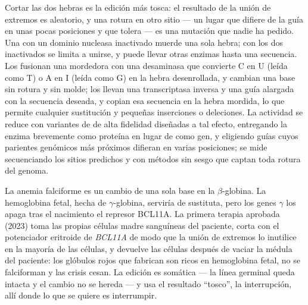 \begin{proposition}\label{prop:b3:genetic-engineering:editors}
Cortar las dos hebras es la edición más tosca: el resultado de la unión
de extremos es aleatorio, y una rotura en otro sitio --- un lugar
\emph{} que difiere de la guía en unas pocas posiciones y
que  tolera --- es una mutación que nadie ha pedido. Una  con un
dominio nucleasa inactivado muerde una sola hebra; con los dos
inactivados se limita a unirse, y puede llevar otras enzimas hasta una
secuencia. Los \emph{} fusionan una  mordedora con
una desaminasa que convierte C en U (leída como T) o A en I (leída como
G) en la hebra desenrollada, y cambian una base sin rotura y sin molde;
los \emph{} llevan una transcriptasa inversa y una guía
alargada con la secuencia deseada, y copian esa secuencia en la hebra
mordida, lo que permite cualquier sustitución y pequeñas inserciones o
deleciones. La actividad  se reduce con variantes de 
de alta fidelidad diseñadas a tal efecto, entregando la enzima brevemente
como proteína en lugar de como gen, y eligiendo guías cuyos parientes
genómicos más próximos difieran en varias posiciones; se mide
secuenciando los sitios predichos y con métodos sin sesgo que captan toda
rotura del genoma.
\end{proposition}

\begin{example}\label{ex:b3:genetic-engineering:sickle}
La anemia falciforme es un cambio de una sola base en la
$\beta$-globina. La hemoglobina fetal, hecha de $\gamma$-globina,
serviría de sustituta, pero los genes $\gamma$ los apaga tras el
nacimiento el represor BCL11A. La primera terapia  aprobada (2023)
toma las propias células madre sanguíneas del paciente, corta con  el
potenciador eritroide de \emph{BCL11A} de modo que la unión de extremos
lo inutilice en la mayoría de las células, y devuelve las células después
de vaciar la médula del paciente: los glóbulos rojos que fabrican son
ricos en hemoglobina fetal, no se falciforman y las crisis cesan. La
edición es somática --- la línea germinal queda intacta y el cambio no se
hereda --- y usa el resultado ``tosco'', la interrupción, allí donde lo
que se quiere es interrumpir.
\end{example}

